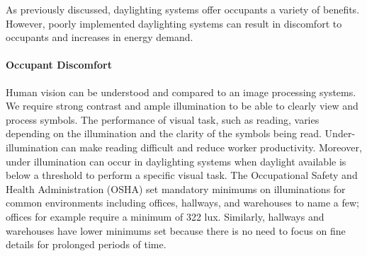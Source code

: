     As previously discussed, daylighting systems offer occupants a variety of benefits. However, poorly implemented daylighting systems can result in discomfort to occupants and increases in energy demand.

    \paragraph{Occupant Discomfort}

    Human vision can be understood and compared to an image processing systems.
    We require strong contrast and ample illumination to be able to clearly view and process symbols.
    The performance of visual task, such as reading, varies depending on the illumination and the clarity of the symbols being read.
    Under-illumination can make reading difficult and reduce worker productivity\cite{boyce}.
    Moreover, under illumination can occur in daylighting systems when daylight available is below a threshold to perform a specific visual task.
    The Occupational Safety and Health Administration (OSHA) set mandatory minimums on illuminations for common environments including offices, hallways, and warehouses to name a few;
    offices for example require a minimum of 322 lux.
    Similarly, hallways and warehouses have lower minimums set because there is no need to focus on fine details for prolonged periods of time\cite{OSHA}. \\

